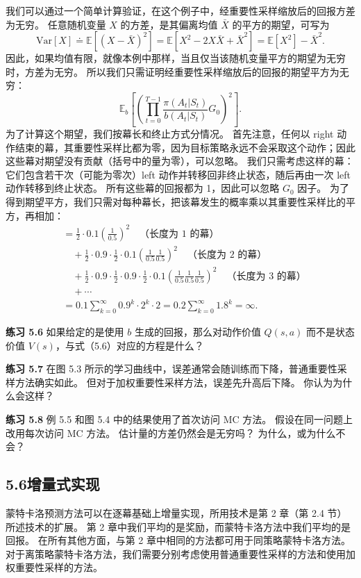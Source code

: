 \documentclass[UTF8,12pt,a4paper,fontset=fandol]{ctexart}
\begin{document}
我们可以通过一个简单计算验证，在这个例子中，经重要性采样缩放后的回报方差为无穷。
任意随机变量 $X$ 的方差，是其偏离均值 $\bar X$ 的平方的期望，可写为
\[
\mathrm{Var}[X]\doteq
\mathbb{E}\!\left[(X-\bar X)^2\right]
=\mathbb{E}[X^2-2X\bar X+\bar X^2]
=\mathbb{E}[X^2]-\bar X^2.
\]
因此，如果均值有限，就像本例中那样，当且仅当该随机变量平方的期望为无穷时，方差为无穷。
所以我们只需证明经重要性采样缩放后的回报的期望平方为无穷：
\[
\mathbb{E}_b\!\left[
\left(
\prod_{t=0}^{T-1}\frac{\pi(A_t|S_t)}{b(A_t|S_t)}G_0
\right)^2
\right].
\]
为了计算这个期望，我们按幕长和终止方式分情况。
首先注意，任何以 right 动作结束的幕，其重要性采样比都为零，因为目标策略永远不会采取这个动作；因此这些幕对期望没有贡献（括号中的量为零），可以忽略。
我们只需考虑这样的幕：它们包含若干次（可能为零次）left 动作并转移回非终止状态，随后再由一次 left 动作转移到终止状态。
所有这些幕的回报都为 1，因此可以忽略 $G_0$ 因子。
为了得到期望平方，我们只需对每种幕长，把该幕发生的概率乘以其重要性采样比的平方，再相加：
\[
\begin{aligned}
&= \frac12\cdot 0.1\left(\frac{1}{0.5}\right)^2
\quad\text{（长度为 1 的幕）}\\
&\quad + \frac12\cdot 0.9\cdot\frac12\cdot 0.1
\left(\frac{1}{0.5}\frac{1}{0.5}\right)^2
\quad\text{（长度为 2 的幕）}\\
&\quad + \frac12\cdot 0.9\cdot\frac12\cdot 0.9\cdot\frac12\cdot 0.1
\left(\frac{1}{0.5}\frac{1}{0.5}\frac{1}{0.5}\right)^2
\quad\text{（长度为 3 的幕）}\\
&\quad + \cdots\\
&=0.1\sum_{k=0}^{\infty}0.9^k\cdot 2^k\cdot 2
=0.2\sum_{k=0}^{\infty}1.8^k
=\infty.
\end{aligned}
\]

\noindent\textbf{练习 5.6}
如果给定的是使用 $b$ 生成的回报，那么对动作价值 $Q(s,a)$ 而不是状态价值 $V(s)$，与式（5.6）对应的方程是什么？

\noindent\textbf{练习 5.7}
在图 5.3 所示的学习曲线中，误差通常会随训练而下降，普通重要性采样方法确实如此。
但对于加权重要性采样方法，误差先升高后下降。
你认为为什么会这样？

\noindent\textbf{练习 5.8}
例 5.5 和图 5.4 中的结果使用了首次访问 MC 方法。
假设在同一问题上改用每次访问 MC 方法。
估计量的方差仍然会是无穷吗？
为什么，或为什么不会？

\subsection*{5.6\quad 增量式实现}

蒙特卡洛预测方法可以在逐幕基础上增量实现，所用技术是第 2 章（第 2.4 节）所述技术的扩展。
第 2 章中我们平均的是奖励，而蒙特卡洛方法中我们平均的是回报。
在所有其他方面，与第 2 章中相同的方法都可用于同策略蒙特卡洛方法。
对于离策略蒙特卡洛方法，我们需要分别考虑使用普通重要性采样的方法和使用加权重要性采样的方法。
\end{document}
